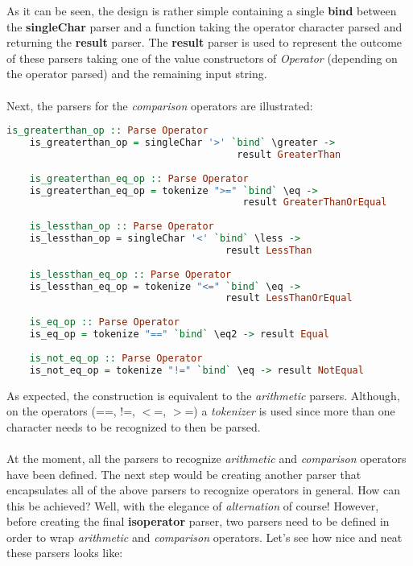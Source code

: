 \documentclass[a4paper, onecolumn]{article}
\begin{document}
    \noindent As it can be seen, the design is rather simple containing a single \textbf{bind} between the \textbf{singleChar} parser and a function taking the operator character parsed and returning the \textbf{result} parser. The \textbf{result} parser is used to represent the outcome of these parsers taking one of the value constructors of \textit{Operator} (depending on the operator parsed) and the remaining input string. \\ \\ 
    Next, the parsers for the \textit{comparison} operators are illustrated:
    
    \begin{tcolorbox}
    \begin{lstlisting}[language=Haskell] 
    is_greaterthan_op :: Parse Operator 
    is_greaterthan_op = singleChar '>' `bind` \greater -> 
                                        result GreaterThan
    
    is_greaterthan_eq_op :: Parse Operator 
    is_greaterthan_eq_op = tokenize ">=" `bind` \eq -> 
                                         result GreaterThanOrEqual
    
    is_lessthan_op :: Parse Operator 
    is_lessthan_op = singleChar '<' `bind` \less ->
                                      result LessThan
    
    is_lessthan_eq_op :: Parse Operator 
    is_lessthan_eq_op = tokenize "<=" `bind` \eq -> 
                                      result LessThanOrEqual
    
    is_eq_op :: Parse Operator
    is_eq_op = tokenize "==" `bind` \eq2 -> result Equal
    
    is_not_eq_op :: Parse Operator
    is_not_eq_op = tokenize "!=" `bind` \eq -> result NotEqual
    \end{lstlisting}
    \end{tcolorbox}
    
    \noindent As expected, the construction is equivalent to the \textit{arithmetic} parsers. Although, on the operators (==, !=, $<$=, $>$=) a \textit{tokenizer} is used since more than one character needs to be recognized to then be parsed. \\ \\
    At the moment, all the parsers to recognize \textit{arithmetic} and \textit{comparison} operators have been defined. The next step would be creating another parser that encapsulates all of the above parsers to recognize operators in general. How can this be achieved? Well, with the elegance of \textit{alternation} of course! However, before creating the final \textbf{is\textunderscore operator} parser, two parsers need to be defined in order to wrap \textit{arithmetic} and \textit{comparison} operators. Let's see how nice and neat these parsers looks like:
    
\end{document}
